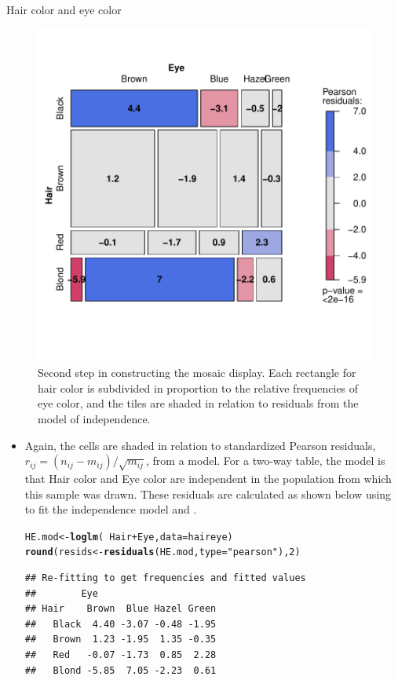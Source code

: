 \documentclass[11pt]{book}\usepackage[]{graphicx}\usepackage[]{color}
\makeatletter
\newcommand{\hlnum}[1]{\textcolor[rgb]{0.686,0.059,0.569}{#1}}%
\newcommand{\hlstr}[1]{\textcolor[rgb]{0.192,0.494,0.8}{#1}}%
\newcommand{\hlopt}[1]{\textcolor[rgb]{0,0,0}{#1}}%
\newcommand{\hlstd}[1]{\textcolor[rgb]{0.345,0.345,0.345}{#1}}%
\newcommand{\hlkwb}[1]{\textcolor[rgb]{0.69,0.353,0.396}{#1}}%
\newcommand{\hlkwc}[1]{\textcolor[rgb]{0.333,0.667,0.333}{#1}}%
\newcommand{\hlkwd}[1]{\textcolor[rgb]{0.737,0.353,0.396}{\textbf{#1}}}%
\newenvironment{kframe}{%
 \def\at@end@of@kframe{}%
 \ifinner\ifhmode%
  \def\at@end@of@kframe{\end{minipage}}%
  \begin{minipage}{\columnwidth}%
 \fi\fi%
 \def\FrameCommand##1{\hskip\@totalleftmargin \hskip-\fboxsep
 \colorbox{shadecolor}{##1}\hskip-\fboxsep
     \hskip-\linewidth \hskip-\@totalleftmargin \hskip\columnwidth}%
 \MakeFramed {\advance\hsize-\width
   \@totalleftmargin\z@ \linewidth\hsize
   \@setminipage}}%
 {\par\unskip\endMakeFramed%
 \at@end@of@kframe}
\newenvironment{knitrout}{}{} %
\renewenvironment{knitrout}{\small\renewcommand{\baselinestretch}{.85}}{} %
\makeatother
\begin{document}
\begin{Example}[haireye2a]{Hair color and eye color}
\begin{knitrout}
\begin{figure}[htbp]
\centerline{\includegraphics[width=.6\textwidth]{ch05/fig/haireye-mos8} }

\caption[Second step in constructing the mosaic display]{Second step in constructing the mosaic display.  Each rectangle for hair color is subdivided in proportion to the relative frequencies of eye color, and the tiles are shaded in relation to residuals from the model of independence.\label{fig:haireye-mos8}}
\end{figure}


\end{knitrout}

\begin{itemize}
\item Again, the cells are shaded in relation to standardized Pearson
residuals, \(r_{ij} = (n_{ij} - m_{ij}) / \sqrt { m_{ij} }\), 
from a model.  For a two-way table, the model is that Hair color and
Eye color are independent in the population from which this sample
was drawn.  These residuals are calculated as shown below using
 to fit the independence model and .
\begin{knitrout}
\color{fgcolor}\begin{kframe}
\begin{alltt}
\hlstd{HE.mod} \hlkwb{<-} \hlkwd{loglm}\hlstd{(}\hlopt{~} \hlstd{Hair} \hlopt{+} \hlstd{Eye,} \hlkwc{data}\hlstd{=haireye)}
\hlkwd{round}\hlstd{(resids} \hlkwb{<-} \hlkwd{residuals}\hlstd{(HE.mod,} \hlkwc{type}\hlstd{=}\hlstr{"pearson"}\hlstd{),} \hlnum{2}\hlstd{)}
\end{alltt}
\begin{verbatim}
## Re-fitting to get frequencies and fitted values
##        Eye
## Hair    Brown  Blue Hazel Green
##   Black  4.40 -3.07 -0.48 -1.95
##   Brown  1.23 -1.95  1.35 -0.35
##   Red   -0.07 -1.73  0.85  2.28
##   Blond -5.85  7.05 -2.23  0.61
\end{verbatim}
\end{kframe}
\end{knitrout}


\end{itemize}
\end{Example}
\end{document}
